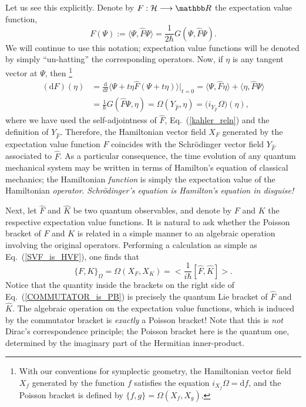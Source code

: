 \documentclass[12pt,aps,eqsecnum,tighten]{revtex4-2}
\def\be{\begin{equation}}
\def\ee{\end{equation}}
\def\ba{\begin{eqnarray}}
\def\ea{\end{eqnarray}}
\def\<{\langle}
\def\>{\rangle}
\def\d{{\mathrm d}}
\def\i{{i}}
\def\H{{\cal H}}
\def\W{\Omega}
\newcommand{\eqn}[1]{Eq.~(\ref{#1})}
\newcommand{\hvf}[1]{{X_{#1}}}
\def\R{\mathbb R}
\begin{document}
Let us see this explicitly.  Denote by $F : \H \longrightarrow \R$ the
expectation value function,
%
\be
	F(\Psi) := \< \Psi, \hat{F}\Psi \> 
		 = \frac{1}{2\hbar}G(\Psi, \hat{F}\Psi).
\ee
%
We will continue to use this notation; expectation value functions
will be denoted by simply ``un-hatting'' the corresponding operators.
Now, if $\eta$ is any tangent vector at $\Psi$, then%
%
\footnote{With our conventions for symplectic geometry, the
Hamiltonian vector field $\hvf{f}$ generated by the function $f$
satisfies the equation $i_\hvf{f}\W = \d f$, and the Poisson bracket
is defined by $\{f, g \} = \W(\hvf{f}, \hvf{g})$.}
%
\ba
\label{SVF_is_HVF}
(\d F)(\eta) &= \frac{\d}{\d t} \< \Psi + t\eta \hat{F}
(\Psi + t \eta) \> \big|_{t=0}
= \< \Psi, \hat{F}\eta \> + \< \eta, \hat{F}\Psi \>\nonumber \\
&= \frac{1}{\hbar} G(\hat{F}\Psi, \eta)
= \W(Y_{\hat{F}}, \eta) = \big(i_{Y_{\hat{F}}} \W\big)(\eta),
\ea
%
where we have used the self-adjointness of $\hat{F}$,
\eqn{kahler_reln} and the definition of $Y_{\hat{F}}$.  Therefore, the
Hamiltonian vector field $\hvf{F}$ generated by the expectation value
function $F$ coincides with the Schr\"odinger vector field
$Y_{\hat{F}}$ associated to $\hat{F}$.  As a particular consequence,
the time evolution of any quantum mechanical system may be written in
terms of Hamilton's equation of classical mechanics; the Hamiltonian
{\em function} is simply the expectation value of the Hamiltonian {\em
operator}.  {\em Schr\"odinger's equation is Hamilton's equation in
disguise!}

Next, let $\hat{F}$ and $\hat{K}$ be two quantum observables, and
denote by $F$ and $K$ the respective expectation value functions.  It
is natural to ask whether the Poisson bracket of $F$ and $K$ is
related in a simple manner to an algebraic operation involving the
original operators. Performing a calculation as simple as
\eqn{SVF_is_HVF}, one finds that
%
\be \label{COMMUTATOR_is_PB}
\{ F, K \}_\W = \W(\hvf{F}, \hvf{K})
= \bigg< \frac{1}{\i\hbar} [\hat{F}, \hat{K}] \bigg>.
\ee
%
Notice that the quantity inside the brackets on the right side of
\eqn{COMMUTATOR_is_PB} is precisely the quantum Lie bracket of
$\hat{F}$ and $\hat{K}$.  The algebraic operation on the expectation
value functions, which is induced by the commutator bracket is {\em
exactly} a Poisson bracket!  Note that this is {\em not} Dirac's
correspondence principle; the Poisson bracket here is the quantum one,
determined by the imaginary part of the Hermitian inner-product.
\end{document}
